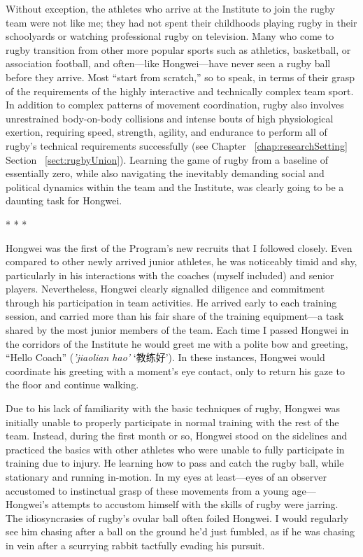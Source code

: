 \begin{CJK}{UTF8}{gbsn}
Without exception, the athletes who arrive at the Institute to join the rugby team were not like me; they had not spent their childhoods playing rugby in their schoolyards or watching professional rugby on television. Many who come to rugby transition from other more popular sports such as athletics, basketball, or association football, and often---like Hongwei---have never seen a rugby ball before they arrive.  Most ``start from scratch,'' so to speak, in terms of their grasp of the requirements of the highly interactive and technically complex team sport. In addition to complex patterns of movement coordination, rugby also involves unrestrained body-on-body collisions and intense bouts of high physiological exertion, requiring speed, strength, agility, and endurance to perform all of rugby's technical requirements successfully (see Chapter ~\ref{chap:researchSetting} Section ~\ref{sect:rugbyUnion}).  Learning the game of rugby from a baseline of essentially zero, while also navigating the inevitably demanding social and political dynamics within the team and the Institute, was clearly going to be a daunting task for Hongwei.


                        \begin{center}
                          * * *
                        \end{center}

Hongwei was the first of the Program’s new recruits that I followed closely.  Even compared to other newly arrived junior athletes, he was noticeably timid and shy, particularly in his interactions with the coaches (myself included) and senior players. Nevertheless, Hongwei clearly signalled diligence and commitment through his participation in team activities.  He arrived early to each training session, and carried more than his fair share of the training equipment---a task shared by the most junior members of the team.  Each time I passed Hongwei in the corridors of the Institute he would greet me with a polite bow and greeting, ``Hello Coach'' (\textit{'jiaolian hao'} `教练好').  In these instances, Hongwei would coordinate his greeting with a moment's eye contact, only to return his gaze to the floor and continue walking.

Due to his lack of familiarity with the basic techniques of rugby, Hongwei was initially unable to properly participate in normal training with the rest of the team.  Instead, during the first month or so, Hongwei stood on the sidelines and practiced the basics with other athletes who were unable to fully participate in training due to injury.  He learning how to pass and catch the rugby ball, while stationary and running in-motion.  In my eyes at least---eyes of an observer accustomed to instinctual grasp of these movements from a young age---Hongwei's attempts to accustom himself with the skills of rugby were jarring.  The idiosyncrasies of rugby's ovular ball often foiled Hongwei.  I would regularly see him chasing after a ball on the ground he'd just fumbled, as if he was chasing in vein after a scurrying rabbit tactfully evading his pursuit.


\end{CJK}
